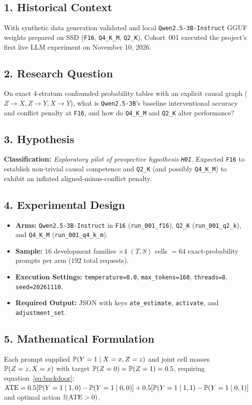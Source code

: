 \subsection*{1. Historical Context}
With synthetic data generation validated and local \texttt{Qwen2.5-3B-Instruct} GGUF weights prepared on SSD (\texttt{F16}, \texttt{Q4\_K\_M}, \texttt{Q2\_K}), Cohort~001 executed the project's first live LLM experiment on November 10, 2026.

\subsection*{2. Research Question}
On exact 4-stratum confounded probability tables with an explicit causal graph ($Z\to X, Z\to Y, X\to Y$), what is \texttt{Qwen2.5-3B}'s baseline interventional accuracy and conflict penalty at \texttt{F16}, and how do \texttt{Q4\_K\_M} and \texttt{Q2\_K} alter performance?

\subsection*{3. Hypothesis}
\textbf{Classification:} \emph{Exploratory pilot of prospective hypothesis \texttt{H01}.} Expected \texttt{F16} to establish non-trivial causal competence and \texttt{Q2\_K} (and possibly \texttt{Q4\_K\_M}) to exhibit an inflated aligned-minus-conflict penalty.

\subsection*{4. Experimental Design}
\begin{itemize}
  \item \textbf{Arms:} \texttt{Qwen2.5-3B-Instruct} in \texttt{F16} (\texttt{run\_001\_f16}), \texttt{Q2\_K} (\texttt{run\_001\_q2\_k}), and \texttt{Q4\_K\_M} (\texttt{run\_001\_q4\_k\_m}).
  \item \textbf{Sample:} $16$ development families $\times 4$ $(T,S)$ cells $= 64$ exact-probability prompts per arm ($192$ total requests).
  \item \textbf{Execution Settings:} \texttt{temperature=0.0}, \texttt{max\_tokens=160}, \texttt{threads=8}, \texttt{seed=20261110}.
  \item \textbf{Required Output:} JSON with keys \texttt{ate\_estimate}, \texttt{activate}, and \texttt{adjustment\_set}.
\end{itemize}

\subsection*{5. Mathematical Formulation}
Each prompt supplied $\mathbb{P}(Y=1\mid X=x, Z=z)$ and joint cell masses $\mathbb{P}(Z=z, X=x)$ with target $\mathbb{P}(Z=0)=\mathbb{P}(Z=1)=0.5$, requiring equation~\eqref{eq:backdoor}: $\mathrm{ATE} = 0.5[\mathbb{P}(Y=1\mid 1,0)-\mathbb{P}(Y=1\mid 0,0)] + 0.5[\mathbb{P}(Y=1\mid 1,1)-\mathbb{P}(Y=1\mid 0,1)]$ and optimal action $\mathbb{I}(\mathrm{ATE} > 0)$.


